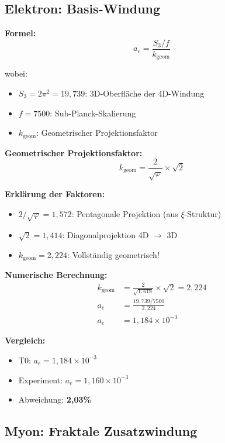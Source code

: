 	\subsection{Elektron: Basis-Windung}
	
	\textbf{Formel:}
	\begin{equation}
		a_e = \frac{S_3/f}{k_{\text{geom}}}
		\label{eq:ae}
	\end{equation}
	
	wobei:
	\begin{itemize}
		\item $S_3 = 2\pi^2 = 19{,}739$: 3D-Oberfläche der 4D-Windung
		\item $f = 7500$: Sub-Planck-Skalierung
		\item $k_{\text{geom}}$: Geometrischer Projektionsfaktor
	\end{itemize}
	
	\textbf{Geometrischer Projektionsfaktor:}
	\begin{equation}
		k_{\text{geom}} = \frac{2}{\sqrt{\varphi}} \times \sqrt{2}
		\label{eq:kgeom}
	\end{equation}
	
	\textbf{Erklärung der Faktoren:}
	\begin{itemize}
		\item $2/\sqrt{\varphi} = 1{,}572$: Pentagonale Projektion (aus $\xi$-Struktur)
		\item $\sqrt{2} = 1{,}414$: Diagonalprojektion 4D $\to$ 3D
		\item $k_{\text{geom}} = 2{,}224$: Vollständig geometrisch!
	\end{itemize}
	
	\textbf{Numerische Berechnung:}
	\begin{align}
		k_{\text{geom}} &= \frac{2}{\sqrt{1{,}618}} \times \sqrt{2} = 2{,}224 \\
		a_e &= \frac{19{,}739 / 7500}{2{,}224} \\
		a_e &= 1{,}184 \times 10^{-3}
	\end{align}
	
	\textbf{Vergleich:}
	\begin{itemize}
		\item T0: $a_e = 1{,}184 \times 10^{-3}$
		\item Experiment: $a_e = 1{,}160 \times 10^{-3}$
		\item Abweichung: \textbf{2{,}03\%}
	\end{itemize}
	
	\subsection{Myon: Fraktale Zusatzwindung}
	
